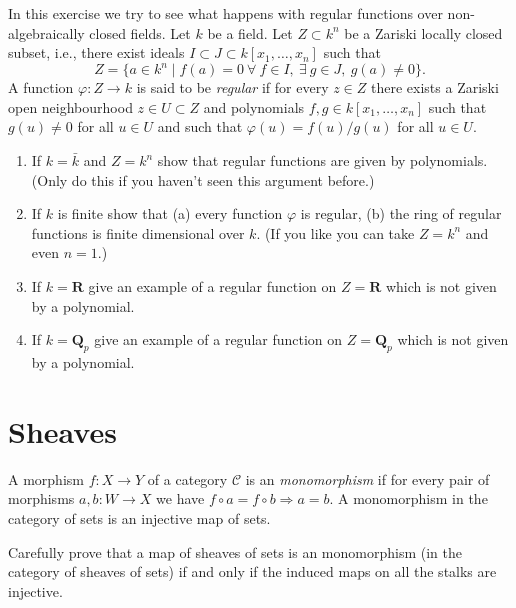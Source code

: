 \begin{exercise}
\label{exercise-regular-functions}
In this exercise we try to see what happens with regular functions
over non-algebraically closed fields. Let $k$ be a field.
Let $Z \subset k^n$ be a Zariski locally closed subset, i.e., there
exist ideals $I \subset J \subset k[x_1, \ldots, x_n]$ such that
$$
Z = \{a \in k^n \mid
f(a) = 0\ \forall\ f \in I,\ \exists\ g \in J,\ g(a) \not = 0\}.
$$
A function $\varphi : Z \to k$ is said to be {\it regular} if for every
$z \in Z$ there exists a Zariski open neighbourhood $z \in U \subset Z$
and polynomials $f, g \in k[x_1, \ldots, x_n]$ such that
$g(u) \not = 0$ for all $u \in U$ and such that
$\varphi(u) = f(u)/g(u)$ for all $u \in U$.
\begin{enumerate}
\item If $k = \bar k$ and $Z = k^n$ show that regular functions are
given by polynomials. (Only do this if you haven't seen this argument
before.)
\item If $k$ is finite show that (a) every function $\varphi$ is regular,
(b) the ring of regular functions is finite dimensional over $k$.
(If you like you can take $Z = k^n$ and even $n = 1$.)
\item If $k = \mathbf{R}$ give an example of a regular function on
$Z = \mathbf{R}$ which is not given by a polynomial.
\item If $k = \mathbf{Q}_p$ give an example of a regular function on
$Z = \mathbf{Q}_p$ which is not given by a polynomial.
\end{enumerate}
\end{exercise}






\section{Sheaves}
\label{section-sheaves}

\noindent
A morphism $f : X \to Y$ of a category $\mathcal{C}$ is an {\it monomorphism}
if for every pair of morphisms $a, b : W \to X$ we have
$f \circ a = f \circ b \Rightarrow a = b$. A monomorphism in the category
of sets is an injective map of sets.

\begin{exercise}
\label{exercise-mono-sheaves-sets}
Carefully prove that a map of sheaves of sets is an monomorphism
(in the category of sheaves of sets) if and only if the induced maps on
all the stalks are injective.
\end{exercise}

